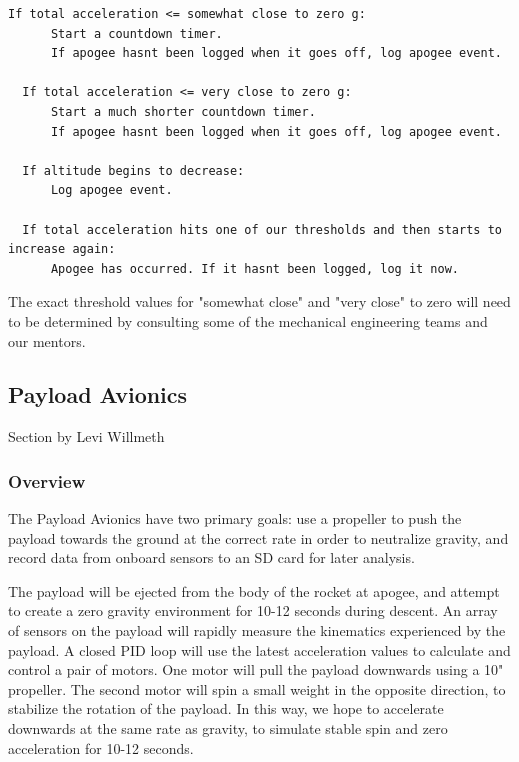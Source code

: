 \documentclass[onecolumn, draftclsnofoot, 10pt, compsoc]{IEEEtran}
\begin{document}
\begin{minipage}{\linewidth}
  \begin{lstlisting}[frame=single]
  If total acceleration <= somewhat close to zero g:
      Start a countdown timer.
      If apogee hasnt been logged when it goes off, log apogee event.

  If total acceleration <= very close to zero g:
      Start a much shorter countdown timer.
      If apogee hasnt been logged when it goes off, log apogee event.

  If altitude begins to decrease:
      Log apogee event.

  If total acceleration hits one of our thresholds and then starts to increase again:
      Apogee has occurred. If it hasnt been logged, log it now.
  \end{lstlisting}
\end{minipage}

The exact threshold values for "somewhat close" and "very close" to zero will need to be determined by consulting some of the mechanical engineering teams and our mentors. 


\subsection{Payload Avionics}
Section by Levi Willmeth

\subsubsection{Overview}
The Payload Avionics have two primary goals: use a propeller to push the payload towards the ground at the correct rate in order to neutralize gravity, and record data from onboard sensors to an SD card for later analysis.

The payload will be ejected from the body of the rocket at apogee, and attempt to create a zero gravity environment for 10-12 seconds during descent.  An array of sensors on the payload will rapidly measure the kinematics experienced by the payload.  A closed PID loop will use the latest acceleration values to calculate and control a pair of motors.  One motor will pull the payload downwards using a 10" propeller.  The second motor will spin a small weight in the opposite direction, to stabilize the rotation of the payload.  In this way, we hope to accelerate downwards at the same rate as gravity, to simulate stable spin and zero acceleration for 10-12 seconds.
\end{document}
